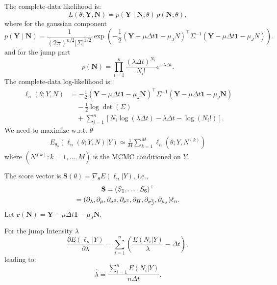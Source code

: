\documentclass[a4paper,11pt]{amsart}
\theoremstyle{definition}
\theoremstyle{plain}
\theoremstyle{remark}
\newcommand{\1}{\mathbf{1}}
\newcommand{\p}{\partial}
\begin{document}
The complete-data likelihood is:
\begin{equation*}
	L(\theta; \mathbf{Y}, \mathbf{N}) = p(\mathbf{Y} \mid \mathbf{N}; \theta)\, p(\mathbf{N}; \theta),
\end{equation*}
where for the gaussian component 
\begin{equation*}
	p(\mathbf{Y} \mid \mathbf{N}) =
	\frac{1}{(2\pi)^{n/2} |\Sigma|^{1/2}}
	\exp\left(
	-\frac{1}{2}
	(\mathbf{Y} - \mu \Delta t \mathbf{1} -\mu_J N)^\top
	\Sigma^{-1}
	(\mathbf{Y} - \mu \Delta t \mathbf{1} -\mu_J N)
	\right).
\end{equation*}
and for the jump part
\begin{equation*}
	p(\mathbf{N}) =
	\prod_{i=1}^n
	\frac{(\lambda \Delta t)^{N_i}}{N_i!}
	e^{-\lambda \Delta t}.
\end{equation*}
The complete-data log-likelihood is:
\begin{equation*}
	\begin{aligned}
		\ell_n(\theta; Y,N)
		&=
		-\frac{1}{2}
		(\mathbf{Y} - \mu \Delta t \mathbf{1} - \mu_J \mathbf{N} )^\top
		\Sigma^{-1}
		(\mathbf{Y} - \mu \Delta t \mathbf{1} - \mu_J \mathbf{N}) \\
		&\quad
		-\frac{1}{2} \log \det(\Sigma) \\
		&\quad
		+ \sum_{i=1}^n
		\left[
		N_i \log(\lambda \Delta t)
		- \lambda \Delta t
		- \log(N_i!)
		\right].
	\end{aligned}
\end{equation*}
We need to maximize w.r.t.
$\theta$
\begin{align*}
E_{\theta_0}(\ell_n(\theta;Y,N)| Y)
\simeq \frac{1}{M}
\sum_{k=1}^M \ell_n(\theta;Y,N^{(k)})
\end{align*}
where $(N^{(k)}: k=1,\dots,M)$
is the MCMC conditioned on $Y$.

The score vector is 
$\mathbf{S}(\theta)=\nabla_\theta E(\ell_n|Y)$, i.e.,
	\begin{gather*}
		\mathbf{S}=(S_1,\ldots,S_6)^\top\\ 
		= (\p_\lambda,\p_\mu,\p_{\sigma^2},\p_{\nu^2},\p_H,\p_{\sigma_J^2},\p_{\mu_J})\ell_n.\notag
    \end{gather*} 
Let $\mathbf{r(N)} = \mathbf{Y} - \mu \Delta t \mathbf{1} - \mu_J\mathbf{N}$.

For the jump Intensity $\lambda$
\begin{equation*}
	\frac{\partial E(\ell_n|Y)}{\partial \lambda}
	=
	\sum_{i=1}^n \left( \frac{E(N_i|Y)}{\lambda} - \Delta t \right),
\end{equation*}
leading to:
\begin{equation*}
	\hat{\lambda} = \frac{\sum_{i=1}^n E(N_i|Y)}{n \Delta t}.
\end{equation*}
\end{document}
